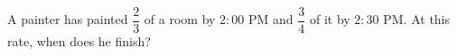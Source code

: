 A painter has painted $\dfrac{2}{3}$ of a room by $2{:}00$ PM and $\dfrac{3}{4}$ of it by $2{:}30$ PM. At this rate, when does he finish?
